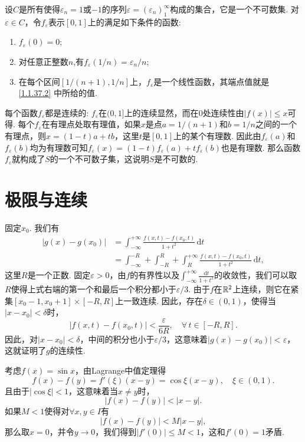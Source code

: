 \begin{ans}
  设$C$是所有使得$\varepsilon_n=1$或$-1$的序列$\varepsilon=(\varepsilon_n)_1^\infty$构成的集合，它是一个不可数集. 对$\varepsilon\in C$，令$f_\varepsilon$表示$[0,1]$上的满足如下条件的函数:
  \begin{enumerate}
    \item $f_\varepsilon(0) = 0$;
    \item\label{1.1.37.2} 对任意正整数$n$,有$f_\varepsilon(1/n)=\varepsilon_n/n$;
    \item 在每个区间$[1/(n+1),1/n]$上，$f_\varepsilon$是一个线性函数，其端点值就是 \ref{1.1.37.2} 中所给的值.
  \end{enumerate}

  每个函数$f_\varepsilon$都是连续的: $f_\varepsilon$在$(0,1]$上的连续显然，而在$0$处连续性由$|f(x)|\le x$可得. 每个$f_\varepsilon$在有理点处取有理值，如果$x$是点$a=1/(n+1)$和$b=1/n$之间的一个有理点，则$x=(1-t)a+tb$，这里$t$是$[0,1]$上的某个有理数. 因此由$f_\varepsilon(a)$和$f_\varepsilon(b)$均为有理数可知$f_\varepsilon(x)=(1-t)f_\varepsilon(a)+tf_\varepsilon(b)$也是有理数. 那么函数$f_\varepsilon$就构成了$S$的一个不可数子集，这说明$S$是不可数的.
\end{ans}

\section{极限与连续}
\begin{ans}
  固定$x_0$. 我们有
  \begin{align*}
    |g(x)-g(x_0)| & = \int_{-\infty}^{+\infty}
    \frac{f(x,t)-f(x_0,t)}{1+t^2}\,\mathrm dt \\
    & = \int_{-\infty}^{-R}+\int_{-R}^R+\int_R^{+\infty}
    \frac{f(x,t)-f(x_0,t)}{1+t^2}\,\mathrm dt,
  \end{align*}
  这里$R$是一个正数. 固定$\varepsilon>0$，由$f$的有界性以及$\int_{-\infty}^{+\infty}\frac{\mathrm dt}{1+t^2}$的收敛性，我们可以取$R$使得上式右端的第一个和最后一个积分都小于$\varepsilon/3$. 由于$f$在$\mathbb R^2$上连续，则它在紧集$[x_0-1,x_0+1]\times[-R,R]$上一致连续. 因此，存在$\delta\in(0,1)$，使得当$|x-x_0|<\delta$时，
  \[ |f(x,t)-f(x_0,t)|<\frac{\varepsilon}{6R},\quad
  \forall\,t\in[-R,R]. \]
  因此，对$|x-x_0|<\delta$，中间的积分也小于$\varepsilon/3$，这意味着$|g(x)-g(x_0)|<\varepsilon$，这就证明了$g$的连续性.
\end{ans}

\begin{ans}
  考虑$f(x)=\sin x$，由Lagrange中值定理得
  \[ f(x)-f(y)=f'(\xi)(x-y)=\cos\xi(x-y),\quad \xi\in(0,1). \]
  且由于$|\cos\xi|<1$，这意味着当$x\ne y$时，
  \[ |f(x)-f(y)| < |x-y|. \]
  如果$M<1$使得对$\forall x,y\in I$有
  \[ |f(x)-f(y)|<M|x-y|, \]
  那么取$x=0$，并令$y\to0$，我们得到$|f'(0)|\le M<1$，这和$f'(0)=1$矛盾.
\end{ans}

